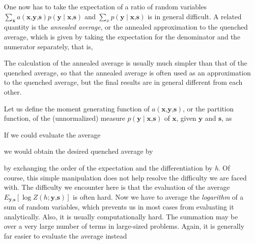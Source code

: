 \documentclass[letterpaper,english,10pt]{article}
\begin{document}

One now has to take the expectation of a ratio of random variables $\sum_{\textbf{x}}a(\textbf{x,y,s})p(\textbf{y} \mid \textbf{x,s})$ and $\sum_{x} p(\textbf{y} \mid \textbf{x,s})$ is in general difficult. A related quantity is the \textit{annealed average}, or the annealed approximation to the quenched average, which is given by taking the expectation for the denominator and the
numerator separately, that is,


The calculation of the annealed average is usually much simpler than that of the quenched average, so that the annealed average is often used as an approximation to the quenched average, but the final results are in general different from each other.

Let us define the moment generating function of $a(\textbf{x,y,s})$, or the partition function, of the (unnormalized) measure $p(\textbf{y} \mid \textbf{x,s})$ of $\textbf{x}$, given $\textbf{y}$ and $\textbf{s}$, as


If we could evaluate the average


we would obtain the desired quenched average by


by exchanging the order of the expectation and the differentiation by \textit{h}. Of course, this simple manipulation does not help resolve the difficulty we are faced with. The difficulty we encounter here is that the evaluation of the average $E_{\textbf{y,s}}[\log{Z(h;\textbf{y,s})}]$ is often hard. Now we have to average the \textit{logarithm} of a sum of random variables, which prevents us in most cases from evaluating it analytically. Also, it is usually computationally hard. The summation may be over a very large number of terms in large-sized problems. Again, it is generally far easier to evaluate the average instead
\end{document}
